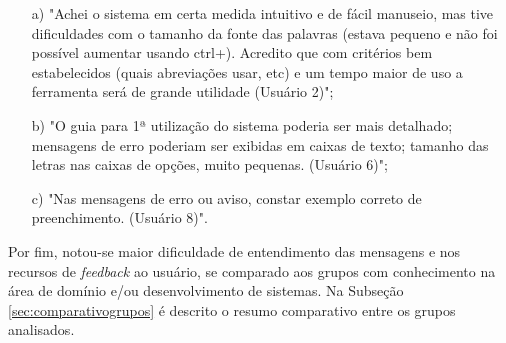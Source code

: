 \begin{enumerate}
    \item [a)] "Achei o sistema em certa medida intuitivo e de fácil manuseio, mas tive dificuldades com o tamanho da fonte das palavras (estava pequeno e não foi possível aumentar usando ctrl+). Acredito que com critérios bem estabelecidos (quais abreviações usar, etc) e um tempo maior de uso a ferramenta será de grande utilidade (Usuário 2)";
    \item[b)] "O guia para 1ª utilização do sistema poderia ser mais detalhado; mensagens de erro poderiam ser exibidas em caixas de texto; tamanho das letras nas caixas de opções, muito pequenas. (Usuário 6)";
    \item[c)] "Nas mensagens de erro ou aviso, constar exemplo correto de preenchimento. (Usuário 8)".   
\end{enumerate}

Por fim, notou-se maior dificuldade de entendimento das mensagens e nos recursos de \textit{feedback} ao usuário, se comparado aos grupos com conhecimento na área de domínio e/ou desenvolvimento de sistemas. Na Subseção \ref{sec:comparativogrupos} é descrito o resumo comparativo entre os grupos analisados.










